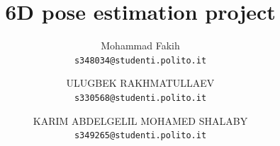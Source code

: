 \documentclass[10pt,twocolumn,letterpaper]{article}
\title{6D pose estimation project}
\author{Mohammad Fakih \\
{\tt\small s348034@studenti.polito.it}
\and
ULUGBEK RAKHMATULLAEV\\
{\tt\small s330568@studenti.polito.it}
\and
KARIM ABDELGELIL MOHAMED SHALABY\\
{\tt\small s349265@studenti.polito.it}
}
\begin{document}
\maketitle
    







{
    \small
    
    
}

% 
\end{document}
